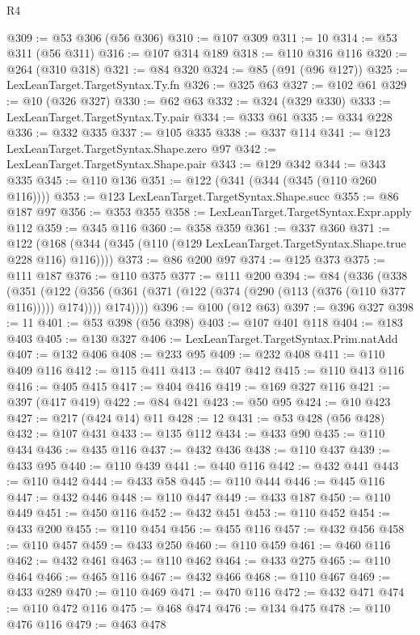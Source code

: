 \begin{lexlean}{R4}
\begin{coremodule}
@309 := @53 @306 (@56 @306)
@310 := @107 @309
@311 := 10
@314 := @53 @311 (@56 @311)
@316 := @107 @314 @189
@318 := @110 @316 @116
@320 := @264 (@310 @318)
@321 := @84 @320
@324 := @85 (@91 (@96 @127))
@325 := LexLeanTarget.TargetSyntax.Ty.fn
@326 := @325 @63
@327 := @102 @61
@329 := @10 (@326 @327)
@330 := @62 @63
@332 := @324 (@329 @330)
@333 := LexLeanTarget.TargetSyntax.Ty.pair
@334 := @333 @61
@335 := @334 @228
@336 := @332 @335
@337 := @105 @335
@338 := @337 @114
@341 := @123 LexLeanTarget.TargetSyntax.Shape.zero @97
@342 := LexLeanTarget.TargetSyntax.Shape.pair
@343 := @129 @342
@344 := @343 @335
@345 := @110 @136
@351 := @122 (@341 (@344 (@345 (@110 @260 @116))))
@353 := @123 LexLeanTarget.TargetSyntax.Shape.succ
@355 := @86 @187 @97
@356 := @353 @355
@358 := LexLeanTarget.TargetSyntax.Expr.apply @112
@359 := @345 @116
@360 := @358 @359
@361 := @337 @360
@371 := @122 (@168 (@344 (@345 (@110 (@129 LexLeanTarget.TargetSyntax.Shape.true @228 @116) @116))))
@373 := @86 @200 @97
@374 := @125 @373
@375 := @111 @187
@376 := @110 @375
@377 := @111 @200
@394 := @84
    (@336
      (@338
        (@351
          (@122
            (@356 (@361 (@371 (@122 (@374 (@290 (@113 (@376 (@110 @377 @116))))) @174))))
            @174))))
@396 := @100 (@12 @63)
@397 := @396 @327
@398 := 11
@401 := @53 @398 (@56 @398)
@403 := @107 @401 @118
@404 := @183 @403
@405 := @130 @327
@406 := LexLeanTarget.TargetSyntax.Prim.natAdd
@407 := @132 @406
@408 := @233 @95
@409 := @232 @408
@411 := @110 @409 @116
@412 := @115 @411
@413 := @407 @412
@415 := @110 @413 @116
@416 := @405 @415
@417 := @404 @416
@419 := @169 @327 @116
@421 := @397 (@417 @419)
@422 := @84 @421
@423 := @50 @95
@424 := @10 @423
@427 := @217 (@424 @14) @11
@428 := 12
@431 := @53 @428 (@56 @428)
@432 := @107 @431
@433 := @135 @112
@434 := @433 @90
@435 := @110 @434
@436 := @435 @116
@437 := @432 @436
@438 := @110 @437
@439 := @433 @95
@440 := @110 @439
@441 := @440 @116
@442 := @432 @441
@443 := @110 @442
@444 := @433 @58
@445 := @110 @444
@446 := @445 @116
@447 := @432 @446
@448 := @110 @447
@449 := @433 @187
@450 := @110 @449
@451 := @450 @116
@452 := @432 @451
@453 := @110 @452
@454 := @433 @200
@455 := @110 @454
@456 := @455 @116
@457 := @432 @456
@458 := @110 @457
@459 := @433 @250
@460 := @110 @459
@461 := @460 @116
@462 := @432 @461
@463 := @110 @462
@464 := @433 @275
@465 := @110 @464
@466 := @465 @116
@467 := @432 @466
@468 := @110 @467
@469 := @433 @289
@470 := @110 @469
@471 := @470 @116
@472 := @432 @471
@474 := @110 @472 @116
@475 := @468 @474
@476 := @134 @475
@478 := @110 @476 @116
@479 := @463 @478

\end{coremodule}
\end{lexlean}
